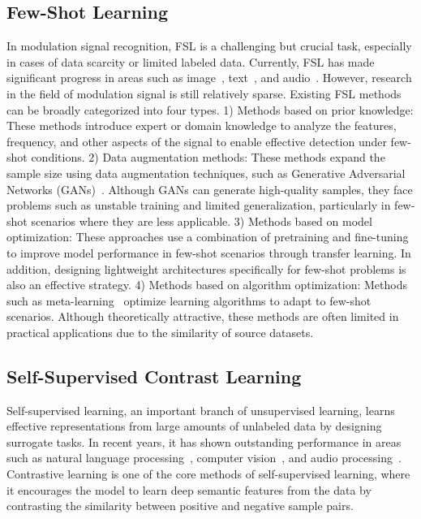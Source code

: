 \subsection{Few-Shot Learning}
In modulation signal recognition, FSL is a challenging but crucial task, especially in cases of data scarcity or limited labeled data. Currently, FSL has made significant progress in areas such as image~\cite{zhang2023learning}, text~\cite{geng2019induction,yan2018few,feng2021survey}, and audio~\cite{heggan2022metaaudio,wang2021few}. However, research in the field of modulation signal is still relatively sparse. Existing FSL methods can be broadly categorized into four types. 1) Methods based on prior knowledge: These methods introduce expert or domain knowledge to analyze the features, frequency, and other aspects of the signal to enable effective detection under few-shot conditions. 2) Data augmentation methods: These methods expand the sample size using data augmentation techniques, such as Generative Adversarial Networks (GANs)~\cite{tang2018digital}. Although GANs can generate high-quality samples, they face problems such as unstable training and limited generalization, particularly in few-shot scenarios where they are less applicable. 3) Methods based on model optimization: These approaches use a combination of pretraining and fine-tuning to improve model performance in few-shot scenarios through transfer learning. In addition, designing lightweight architectures specifically for few-shot problems is also an effective strategy. 4) Methods based on algorithm optimization: Methods such as meta-learning~\cite{finn2017model} optimize learning algorithms to adapt to few-shot scenarios. Although theoretically attractive, these methods are often limited in practical applications due to the similarity of source datasets.

\subsection{Self-Supervised Contrast Learning}
Self-supervised learning, an important branch of unsupervised learning, learns effective representations from large amounts of unlabeled data by designing surrogate tasks. In recent years, it has shown outstanding performance in areas such as natural language processing~\cite{devlin2018bert}, computer vision~\cite{he2022masked}, and audio processing~\cite{niizumi2021byol}. Contrastive learning is one of the core methods of self-supervised learning, where it encourages the model to learn deep semantic features from the data by contrasting the similarity between positive and negative sample pairs.

